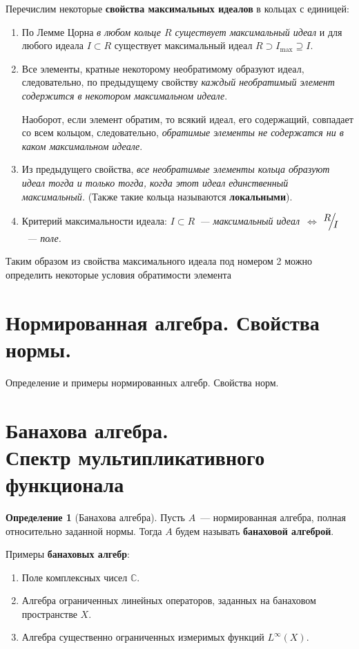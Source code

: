 \documentclass[12pt]{extarticle}
\theoremstyle{definition}
\newtheorem{definition}{\indent Определение}[section]
\newcommand{\factor}[2]{\raisebox{.35em}{$#1$}\kern-.27em\Big/\kern-.27em\raisebox{-.35em}{$#2$}}
\begin{document}
    Перечислим некоторые \textbf{свойства максимальных идеалов} в кольцах с единицей:
    \begin{enumerate}
        \item По Лемме Цорна \textit{в любом кольце $R$ существует максимальный идеал} и для любого идеала $I\subset R$ существует максимальный идеал $R\supset I_{\max}\supseteq I$.
        \item Все элементы, кратные некоторому необратимому образуют идеал, следовательно, по предыдущему свойству \textit{каждый необратимый элемент  содержится в некотором максимальном идеале}.

        Наоборот, если элемент обратим, то всякий идеал, его содержащий, совпадает со всем кольцом, следовательно, \textit{обратимые элементы не содержатся ни в каком максимальном идеале}.
        \item Из предыдущего свойства, \textit{все необратимые элементы кольца образуют идеал тогда и только тогда, когда этот идеал единственный максимальный.} (Также такие кольца называются \textbf{локальными}).
        \item Критерий максимальности идеала: \textit{$I\subset R$~--- максимальный идеал~$\iff$ $\factor{R}{I}$~--- поле.}
    \end{enumerate}

    Таким образом из свойства максимального идеала под номером 2 можно определить некоторые условия обратимости элемента

    \section[Нормы и нормированные алгебры]{Нормированная алгебра. Свойства нормы.}
        Определение и примеры нормированных алгебр. Свойства норм.

    \section[Банаховы алгебры. Спектр]{Банахова алгебра.\\Спектр мультипликативного функционала}
      \begin{definition}[Банахова алгебра]\label{def:Banakh_algebra}
        Пусть $A$~--- нормированная алгебра, полная относительно заданной нормы. Тогда $A$ будем называть \textbf{банаховой алгеброй}.
        \end{definition}
        Примеры \textbf{банаховых алгебр}:
        
        \begin{enumerate}
            \item Поле комплексных чисел $\mathbb{C}$.
            \item Алгебра ограниченных линейных операторов, заданных на банаховом пространстве $X$.
            \item Алгебра существенно ограниченных измеримых функций $L^\infty(X)$.
        \end{enumerate}
        
\end{document}
